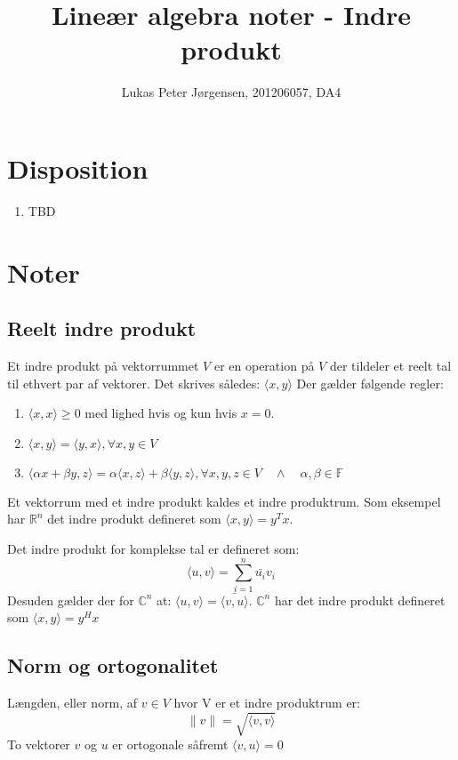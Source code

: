 \documentclass[a4paper,oneside,article]{memoir}
\newcommand{\inner}[2]{\langle #1,#2 \rangle}
\begin{document}
    \title{Lineær algebra noter - Indre produkt}
    \author{Lukas Peter Jørgensen, 201206057, DA4
            }
    \maketitle
    
    \tableofcontents
        
    \chapter{Disposition}
    \begin{enumerate}
    \item TBD
    \end{enumerate}
    
	\chapter{Noter}
	
	\section{Reelt indre produkt}
	Et indre produkt på vektorrummet $V$ er en operation på $V$
	der tildeler et reelt tal til ethvert par af vektorer. Det
	skrives således: $\inner{x}{y}$
	Der gælder følgende regler:
	\begin{enumerate}
	\item $\inner{x}{x} \geq 0$ med lighed hvis og kun hvis $x=0$.
	\item $\inner{x}{y}=\inner{y}{x}, \forall x,y\in V$ 
	\item $\inner{\alpha x + \beta y}{z}=
	\alpha\inner{x}{z}+\beta\inner{y}{z}, 
	\forall x,y,z \in V \quad \wedge \quad \alpha, \beta \in \mathbb{F}$
	\end{enumerate}
	
	Et vektorrum med et indre produkt kaldes et indre produktrum.
	Som eksempel har $\mathbb{R}^n$ det indre produkt defineret
	som $\inner{x}{y} = y^Tx$.
	
	Det indre produkt for komplekse tal er defineret som:
	$$\inner{u}{v}=\sum\limits_{i=1}^{n}\bar{u_i}v_i$$
	Desuden gælder der for $\mathbb{C}^n$ at: $\inner{u}{v} = 
	\bar{\inner{v}{u}}$. $\mathbb{C}^n$ har det indre produkt
	defineret som $\inner{x}{y}=y^Hx$
	
	\section{Norm og ortogonalitet}
	Længden, eller norm, af $v\in V$ hvor V er et indre produktrum er:
	$$\|v\|=\sqrt{\inner{v}{v}}$$
	To vektorer $v$ og $u$ er ortogonale såfremt $\inner{v}{u}=0$
	
\end{document}
